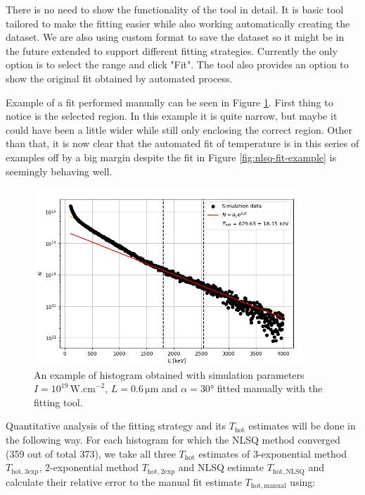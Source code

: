 There is no need to show the functionality of the tool in detail. It is basic tool tailored to make the fitting easier while also working automatically creating the dataset. We are also using custom format to save the dataset so it might be in the future extended to support different fitting strategies. Currently the only option is to select the range and click "Fit". The tool also provides an option to show the original fit obtained by automated process. 

Example of a fit performed manually can be seen in Figure \ref{fig:manual-fit-example}. First thing to notice is the selected region. In this example it is quite narrow, but maybe it could have been a little wider while still only enclosing the correct region. Other than that, it is now clear that the automated fit of temperature is in this series of examples off by a big margin despite the fit in Figure \ref{fig:nlsq-fit-example} is seemingly behaving well.

\begin{figure}[t]
	\centering
	\includegraphics[width=0.9\textwidth]{figures/hist_1e19_060_30_manual}
	\caption{An example of histogram obtained with simulation parameters $I=10^{19}\,\mathrm{W.cm}^{-2}$, $L=0.6\,\mathrm{\mu m}$ and $\alpha = 30$° fitted manually with the fitting tool.}
	\label{fig:manual-fit-example}
\end{figure}

Quantitative analysis of the fitting strategy and its $T_\mathrm{hot}$ estimates will be done in the following way. For each histogram for which the NLSQ method converged (359 out of total 373), we take all three $T_\mathrm{hot}$ estimates of 3-exponential method $T_\mathrm{hot,3exp}$, 2-exponential method $T_\mathrm{hot,2exp}$ and NLSQ estimate $T_\mathrm{hot,NLSQ}$ and calculate their relative error to the manual fit estimate $T_\mathrm{hot,manual}$ using:

